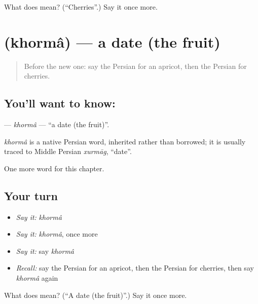 \begin{tcolorbox}[breakable,colback=teal!4,colframe=teal!35!black,title={Before you move on}]
What does  mean? (\textquotedblleft{}Cherries\textquotedblright{}.) Say it once more.
\end{tcolorbox}
\section[\texorpdfstring{\fa{خرما} (khormâ)}{خرما (khormâ)}]{ (khormâ) — a date (the fruit)}

\label{lesson:FA-C100-khorma}



\begin{quote}
Before the new one: say the Persian for an apricot, then the Persian for cherries.
\end{quote}

\subsection*{You'll want to know: }
\textbf{} — \emph{khormâ} — \textquotedblleft{}a date (the fruit)\textquotedblright{}.

\begin{cousinweb}
\emph{khormâ} is a native Persian word, inherited rather than borrowed; it is usually traced to Middle Persian \emph{xurmāg}, \textquotedblleft{}date\textquotedblright{}.
\end{cousinweb}

\begin{grammarlens}[title={What you've built}]
One more word for this chapter.
\end{grammarlens}

\subsection*{Your turn}
\begin{itemize}
\raggedright
  \item \emph{Say it:} \emph{khormâ}
  \item \emph{Say it:} \emph{khormâ}, once more
  \item \emph{Say it:} say \emph{khormâ}
  \item \emph{Recall:} say the Persian for an apricot, then the Persian for cherries, then say \emph{khormâ} again
\end{itemize}

\begin{tcolorbox}[breakable,colback=teal!4,colframe=teal!35!black,title={Before you move on}]
What does  mean? (\textquotedblleft{}A date (the fruit)\textquotedblright{}.) Say it once more.
\end{tcolorbox}
